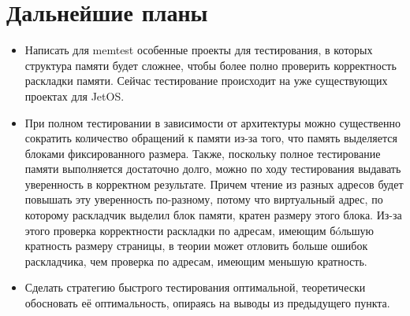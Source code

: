 \documentclass[oneside,senior,etd]{BYUPhys}
\begin{document}
\section{Дальнейшие планы}
\begin{itemize}

\item Написать для memtest особенные проекты для тестирования, в которых структура памяти
будет сложнее, чтобы более полно проверить корректность раскладки памяти.
Сейчас тестирование происходит на уже существующих проектах для JetOS.

\item При полном тестировании в зависимости от архитектуры можно существенно сократить количество
обращений к памяти из-за того, что память выделяется блоками фиксированного размера.
Также, поскольку полное тестирование памяти выполняется достаточно долго, можно
по ходу тестирования выдавать уверенность в корректном результате. Причем чтение из
разных адресов будет повышать эту уверенность по-разному, потому что виртуальный адрес,
по которому раскладчик выделил блок памяти, кратен размеру этого блока. Из-за этого
проверка корректности раскладки по адресам, имеющим б\'oльшую кратность размеру страницы,
в теории может отловить больше ошибок раскладчика, чем проверка по адресам, имеющим
меньшую кратность.

\item Сделать стратегию быстрого тестирования оптимальной, теоретически обосновать её оптимальность,
опираясь на выводы из предыдущего пункта.
\end{itemize}

\nocite{arinc, sanitizer, scons, jetos, allocator}


\raggedright




%


\end{document}
